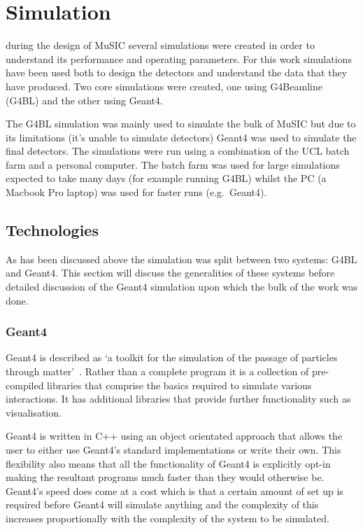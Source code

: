 \part{Simulation} %
\label{prt:simulation}
during the design of MuSIC several simulations were created in order to understand its performance and operating parameters. For this work simulations have been used both to design the detectors and understand the data that they have produced. Two core simulations were created, one using G4Beamline (G4BL) and the other using Geant4. 

The G4BL simulation was mainly used to simulate the bulk of MuSIC but due to its limitations (it's unable to simulate detectors) Geant4 was used to simulate the final detectors. The simulations were run using a combination of the UCL batch farm and a personal computer. The batch farm was used for large simulations expected to take many days (for example running G4BL) whilst the PC (a Macbook Pro laptop) was used for faster runs (e.g.\ Geant4).
\chapter{Technologies} %
\label{cha:technologies}
As has been discussed above the simulation was split between two systems: G4BL and Geant4. This section will discuss the generalities of these systems before detailed discussion of the Geant4 simulation upon which the bulk of the work was done.
\section{Geant4} %
\label{sec:geant4}
Geant4 is described as `a toolkit for the simulation of the passage of particles through matter'~\cite{Geant4 REF}. Rather than a complete program it is a collection of pre-compiled libraries that comprise the basics required to simulate various interactions. It has additional libraries that provide further functionality such as visualisation. 

Geant4 is written in C++ using an object orientated approach that allows the user to either use Geant4's standard implementations or write their own. This flexibility also means that all the functionality of Geant4 is explicitly opt-in making the resultant programs much faster than they would otherwise be. Geant4's speed does come at a cost which is that a certain amount of set up is required before Geant4 will simulate anything and the complexity of this increases proportionally with the complexity of the system to be simulated.

